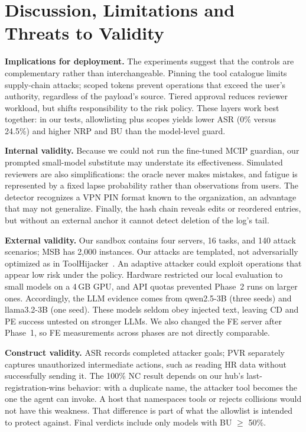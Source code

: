 \documentclass[conference]{IEEEtran}
\begin{document}
\section{Discussion, Limitations and Threats to Validity}
\label{sec:limits}

\textbf{Implications for deployment.} The experiments suggest that the controls are
complementary rather than interchangeable. Pinning the
tool catalogue limits supply-chain attacks; scoped tokens prevent operations that exceed the
user's authority, regardless of the payload's source. Tiered approval reduces reviewer workload,
but shifts responsibility to the risk policy. These layers work best together: in our tests,
allowlisting plus scopes yields lower ASR (0\% versus 24.5\%) and higher NRP and BU than the
model-level guard.

\textbf{Internal validity.} Because we could not run the fine-tuned MCIP guardian, our
prompted small-model substitute may understate its effectiveness. Simulated reviewers are also
simplifications: the oracle never makes mistakes, and fatigue is represented by a fixed lapse
probability rather than observations from users. The detector recognizes a VPN PIN format known
to the organization, an advantage that may not generalize. Finally, the hash chain reveals edits
or reordered entries, but without an external anchor it cannot detect deletion of the log's tail.

\textbf{External validity.} Our sandbox contains four servers, 16 tasks, and 140 attack
scenarios; MSB has 2{,}000 instances. Our attacks are templated, not adversarially optimized as
in ToolHijacker~\cite{shi2026toolhijacker}. An adaptive attacker could exploit operations that
appear low risk under the policy. Hardware restricted our local evaluation to small models on a
4\,GB GPU, and API quotas prevented Phase~2 runs on larger ones. Accordingly, the LLM evidence
comes from qwen2.5-3B (three seeds) and llama3.2-3B (one seed). These models seldom obey injected
text, leaving CD and PE success untested on stronger LLMs. We also changed the FE server after
Phase~1, so FE measurements across phases are not directly comparable.

\textbf{Construct validity.} ASR records completed attacker goals; PVR separately captures
unauthorized intermediate actions, such as reading HR data without successfully sending it.
The 100\% NC result depends on our hub's last-registration-wins behavior: with a duplicate name,
the attacker tool becomes the one the agent can invoke. A host that namespaces tools or rejects
collisions would not have this weakness. That difference is part of what the allowlist is intended
to protect against. Final verdicts include only models with BU $\ge$ 50\%.
\end{document}
